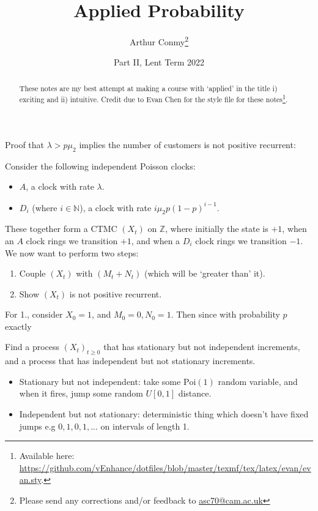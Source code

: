 \documentclass[11pt]{scrartcl}
\begin{document}
\title{Applied Probability}
\author{Arthur Conmy\footnote{Please send any corrections and/or feedback to \url{asc70@cam.ac.uk}}}
\date{Part II, Lent Term 2022}

\maketitle
\begin{abstract}
These notes are my best attempt at making a course with `applied' in the title i) exciting and ii) intuitive.
Credit  due to Evan Chen for the style file for these notes\footnote{Available here: \url{https://github.com/vEnhance/dotfiles/blob/master/texmf/tex/latex/evan/evan.sty}.}.
\end{abstract}

Proof that $\lambda > p\mu_2$ implies the number of customers is not positive recurrent: 

Consider the following independent Poisson clocks:

\begin{itemize}
    \item $A$, a clock with rate $\lambda $.
    \item $D_i$ (where $i \in \mathbb{ N}$), a clock with rate $i\mu_2 p(1-p)^{i-1}$.
\end{itemize}

These together form a CTMC $(X_t)$ on $\mathbb{ Z}$, where initially the state is $+1$, when an $A$ clock rings we transition $+1$, and when a $D_i$ clock rings we transition $-1$. We now want to perform two steps:

\begin{enumerate}
    \item Couple $(X_t)$ with $(M_t+N_t)$ (which will be `greater than' it).
    \item Show $(X_t)$ is not positive recurrent.  
\end{enumerate}

For 1., consider $X_0 = 1$, and $M_0 = 0, N_0 = 1$. Then since with probability $p$ exactly  

\begin{exercise}
    Find a process $(X_t)_{t \ge 0}$ that has stationary but not independent increments, and a process that has independent but not stationary increments.
    \begin{itemize}
        \item Stationary but not independent: take some $\text{Poi}(1)$ random variable, and when it fires, jump some random $U[0,1]$ distance.
        \item Independent but not stationary: deterministic thing which doesn't have fixed jumps e.g $0, 1, 0, 1, ...$ on intervals of length 1.
    \end{itemize}
\end{exercise}
\end{document}
